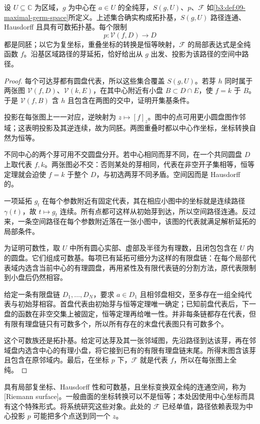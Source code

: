 \begin{proposition}[可达芽空间的局部坐标]\label{b3:prop:09-germ-space}
设 \(U\subseteq\mathbb C\) 为区域，\(g\) 为中心在 \(a\in U\) 的全纯芽，\(S(g,U)\)、\(p\)、\(\mathcal F\) 如\cref{b3:def:09-maximal-germ-space}所定义。上述集合确实构成拓扑基，\(S(g,U)\) 路径连通、Hausdorff 且具有可数拓扑基。每个限制
\[
 p:\mathcal V(f,D)\longrightarrow D
\]
都是同胚；以它为复坐标，重叠坐标的转换是恒等映射，\(\mathcal F\) 的局部表达式是全纯函数 \(f\)。沿基区域路径的芽延拓，恰好给出从 \(g\) 出发、投影为该路径的空间中路径。
\end{proposition}
\begin{proof}
每个可达芽都有圆盘代表，所以这些集合覆盖 \(S(g,U)\)。若芽 \(h\) 同时属于两张图 \(\mathcal V(f,D)\)、\(\mathcal V(k,E)\)，在其中心附近有小盘 \(B\subset D\cap E\)，使 \(f=k\) 于 \(B\)。于是 \(\mathcal V(f,B)\) 含 \(h\) 且包含在两图的交中，证明开集基条件。

投影在每张图上一一对应，逆映射为 \(z\mapsto[f]_z\)。图中的点可用更小圆盘图作邻域；这表明投影及其逆连续，故为同胚。两图重叠时都以中心作坐标，坐标转换自然为恒等。

不同中心的两个芽可用不交圆盘分开。若中心相同而芽不同，在一个共同圆盘 \(D\) 上取代表 \(f,k\)。两张图必不交：否则某处的芽相同，代表在非空开子集相等，恒等定理就会迫使 \(f=k\) 于整个 \(D\)，与初选两芽不同矛盾。空间因而是 Hausdorff 的。

一项延拓 \(g_t\) 在每个参数附近有固定代表，其在相应小图中的坐标就是连续路径 \(\gamma(t)\)，故 \(t\mapsto g_t\) 连续。所有点都可这样从初始芽到达，所以空间路径连通。反过来，一条空间路径在每个参数附近落在一张小图中，该图的代表就满足解析延拓的局部条件。

为证明可数性，取 \(U\) 中所有圆心实部、虚部及半径为有理数，且闭包包含在 \(U\) 内的圆盘。它们组成可数基。每项已有延拓可细分为这样的有限盘链：在每个局部代表域内选含当前中心的有理圆盘，再用紧性及有限代表链的分割方法，原代表限制到小盘后仍然相容。

给定一条有限盘链 \(D_1,\ldots,D_N\)，要求 \(a\in D_1\) 且相邻盘相交，至多存在一组全纯代表与初始芽相容。首盘代表由初始芽与恒等定理唯一确定；已知前盘代表后，下一盘的函数在非空交集上被固定，恒等定理再给唯一性。并非每条链都存在代表，但有限有理盘链只有可数多个，所以所有存在的末盘代表图只有可数多个。

这个可数族还是拓扑基。给定可达芽及其一张邻域图，先沿路径到达该芽，再在邻域盘内选含中心的有理小盘，将它接到已有的有限有理盘链末尾。所得末图含该芽且包含在原邻域内。最后，在坐标 \(p\) 下，\(\mathcal F\) 就是代表 \(f\)，所以在每张图上全纯。
\end{proof}
具有局部复坐标、Hausdorff 性和可数基，且坐标变换双全纯的连通空间，称为[Riemann surface]。一般曲面的坐标转换可以不是恒等；本处因使用中心坐标而具有这个特殊形式。将系统研究这些对象。此处的 \(\mathcal F\) 已经单值，路径依赖表现为中心投影 \(p\) 可能把多个点送到同一个 \(z\)。

